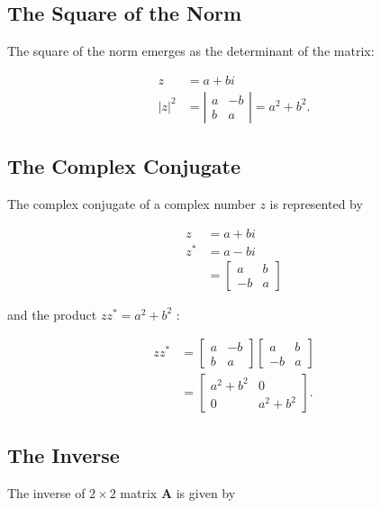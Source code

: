 \subsection{The Square of the Norm}
The square of the norm emerges as the determinant of the matrix:

$$
\begin{aligned}
z & =a+b i \\
|z|^{2} & =\left|\begin{array}{cc}
a & -b \\
b & a
\end{array}\right|=a^{2}+b^{2} .
\end{aligned}
$$

\subsection{The Complex Conjugate}
The complex conjugate of a complex number $z$ is represented by

$$
\begin{aligned}
z & =a+b i \\
z^{*} & =a-b i \\
& =\left[\begin{array}{cc}
a & b \\
-b & a
\end{array}\right]
\end{aligned}
$$

and the product $z z^{*}=a^{2}+b^{2}$ :

$$
\begin{aligned}
z z^{*} & =\left[\begin{array}{cc}
a & -b \\
b & a
\end{array}\right]\left[\begin{array}{cc}
a & b \\
-b & a
\end{array}\right] \\
& =\left[\begin{array}{cc}
a^{2}+b^{2} & 0 \\
0 & a^{2}+b^{2}
\end{array}\right] .
\end{aligned}
$$

\subsection{The Inverse}
The inverse of $2 \times 2$ matrix $\mathbf{A}$ is given by


